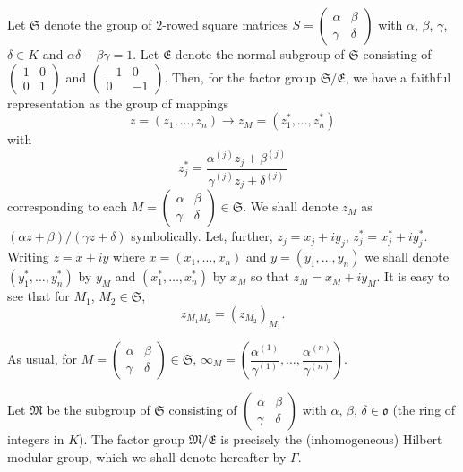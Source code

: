 Let $\mathfrak{S}$ denote the group of $2$-rowed square matrices
$S=\left(\begin{smallmatrix} \alpha & \beta\\ \gamma & \delta
\end{smallmatrix}\right)$ with $\alpha$, $\beta$, $\gamma$, $\delta\in
K$ and $\alpha\delta-\beta\gamma=1$. Let $\mathfrak{E}$ denote the
normal subgroup of $\mathfrak{S}$ consisting of
$\left(\begin{smallmatrix} 1 & 0\\ 0 & 1
\end{smallmatrix}\right)$ and $\left(\begin{smallmatrix} -1 & 0\\ 0 &
  -1
\end{smallmatrix}\right)$. Then, for the factor group
$\mathfrak{S}/\mathfrak{E}$, we have a faithful representation as the
group of mappings 
$$
z=(z_{1},\ldots,z_{n})\to z_{M}=(z^{\ast}_{1},\ldots,z^{\ast}_{n})
$$
with
$$
z^{\ast}_{j}=\frac{\alpha^{(j)}z_{j}+\beta^{(j)}}{\gamma^{(j)}z_{j}+\delta^{(j)}}
$$
corresponding to each $M=\left(\begin{smallmatrix} \alpha &
  \beta\\ \gamma & \delta
\end{smallmatrix}\right)\in\mathfrak{S}$. We shall denote $z_{M}$ as
$(\alpha z+\beta)/(\gamma z+\delta)$ symbolically. Let, further,
$z_{j}=x_{j}+iy_{j}$,
$z^{\ast}_{j}=x^{\ast}_{j}+iy^{\ast}_{j}$. Writing $z=x+iy$ where
$x=(x_{1},\ldots,x_{n})$ and $y=(y_{1},\ldots,y_{n})$ we shall denote
$(y^{\ast}_{1},\ldots,y^{\ast}_{n})$ by $y_{M}$ and
$(x^{\ast}_{1},\ldots,x^{\ast}_{n})$ by $x_{M}$ so that
$z_{M}=x_{M}+iy_{M}$. It is easy to see that for $M_{1}$,
$M_{2}\in\mathfrak{S}$, 
$$
z_{M_{1}M_{2}}=(z_{M_{2}})_{M_{1}}.
$$

As usual, for $M=\left(\begin{smallmatrix} \alpha & \beta\\
\gamma & \delta\end{smallmatrix}\right)\in\mathfrak{S}$,
$\infty_{M}=\left(\dfrac{\alpha^{(1)}}{\gamma^{(1)}},\ldots,\dfrac{\alpha^{(n)}}{\gamma^{(n)}}\right)$.

Let $\mathfrak{M}$ be the subgroup of $\mathfrak{S}$ consisting of
$\left(\begin{smallmatrix} \alpha & \beta\\ \gamma & \delta
\end{smallmatrix}\right)$ with $\alpha$, $\beta$,
$\delta\in\mathfrak{o}$ (the ring of integers in $K$). The factor
group $\mathfrak{M}/\mathfrak{E}$ is precisely the (inhomogeneous)
Hilbert modular group, which we shall denote hereafter by $\Gamma$.

